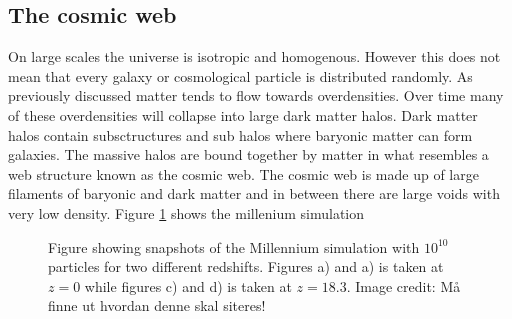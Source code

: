 \subsection{The cosmic web}
On large scales the universe is isotropic and homogenous. However this does not
mean that every galaxy or cosmological particle is distributed randomly. As
previously discussed matter tends to flow towards overdensities. Over time many
of these overdensities will collapse into large dark matter halos. Dark matter
halos contain subsctructures and sub halos where baryonic matter can form
galaxies. The massive halos are bound together by matter in what resembles a
web structure known as the cosmic web. The cosmic web is made up of large
filaments of baryonic and dark matter and in between there are large voids with
very low density. Figure \ref{fig:millenium} shows the millenium simulation
\begin{figure}[htbp]\label{fig:millenium}
    \hspace{1em}%
    \hspace{1em}%
    \caption{Figure showing snapshots of the Millennium simulation with $10^{10}$ particles
    for two different redshifts. Figures a) and a) is taken at $z=0$ while
    figures c) and d) is taken at $z=18.3$. Image credit: Må finne ut hvordan
    denne skal siteres!}
\end{figure}


